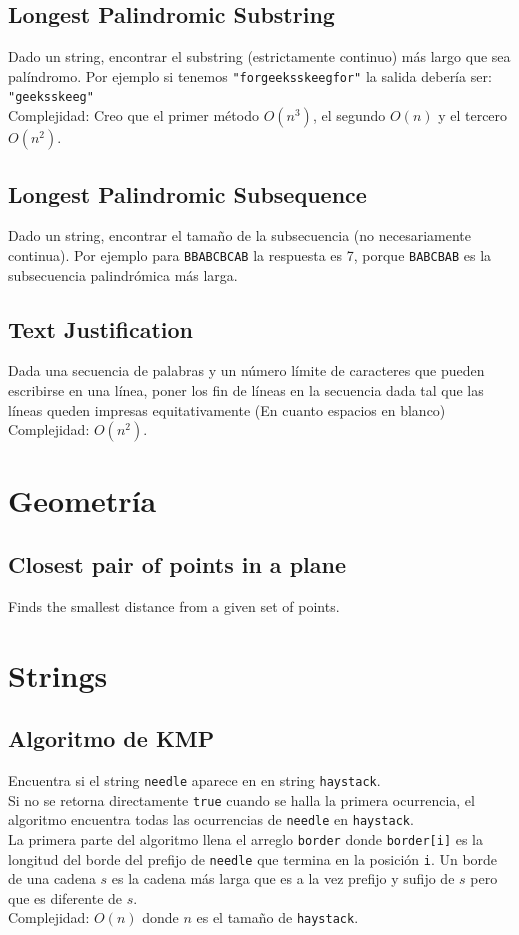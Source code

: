 \documentclass[10pt,letterpaper,twocolumn]{article}
\newcommand{\source}[1]{
  
  \dotfill
}
\begin{document}
  \subsection{Longest Palindromic Substring}
    Dado un string, encontrar el substring (estrictamente continuo) más largo que sea palíndromo. Por ejemplo si tenemos \texttt{"forgeeksskeegfor"} la salida debería ser: \texttt{"geeksskeeg"}\\
    Complejidad: Creo que el primer método $O(n^3)$, el segundo $O(n)$ y el tercero $O(n^2)$.
    \source{./src/longest_palindromic_substring.java}
  \subsection{Longest Palindromic Subsequence}
    Dado un string, encontrar el tamaño de la subsecuencia (no necesariamente continua). Por ejemplo  para \texttt{BBABCBCAB} la respuesta es 7, porque \texttt{BABCBAB} es la subsecuencia palindrómica más larga.
    \source{./src/longest_palindromic_subsequence.cpp}
  \subsection{Text Justification}
    Dada una secuencia de palabras y un número límite de caracteres
    que pueden escribirse en una línea, poner los fin de líneas en la
    secuencia dada tal que las líneas queden impresas equitativamente
    (En cuanto espacios en blanco)
    Complejidad: $O(n^2)$.
    \source{./src/text_justification.java}

\section{Geometría}
  \subsection{Closest pair of points in a plane}
    Finds the smallest distance from a given set of points.
    \source{./src/closest_pair_points.cpp}

\section{Strings}
  \subsection{Algoritmo de KMP}
    Encuentra si el string \verb|needle| aparece en en string \verb|haystack|.\\
    Si no se retorna directamente \verb|true| cuando se halla la primera ocurrencia, el algoritmo encuentra todas las ocurrencias de \verb|needle| en \verb|haystack|.\\
    La primera parte del algoritmo llena el arreglo \verb|border| donde \verb|border[i]| es la longitud del borde del prefijo de \verb|needle| que termina en la posición \verb|i|. Un borde de una cadena $s$ es la cadena más larga que es a la vez prefijo y sufijo de $s$ pero que es diferente de $s$.\\
    Complejidad: $O(n)$ donde $n$ es el tamaño de \verb|haystack|.\\
    \source{./src/kmp.cpp}
\end{document}
